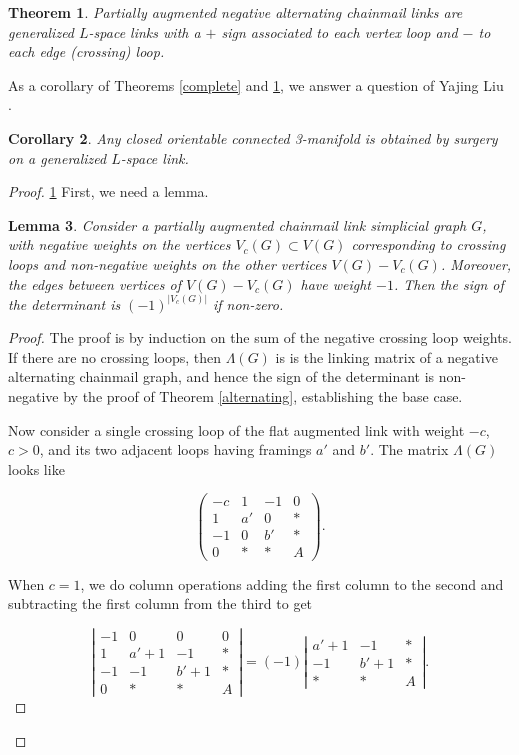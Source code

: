 \documentclass{amsart}
\newtheorem{theorem}{Theorem}[section]
\newtheorem{lemma}[theorem]{Lemma}
\newtheorem{cor}[theorem]{Corollary}
\theoremstyle{definition}
\theoremstyle{remark}
\begin{document}
\begin{theorem} \label{augmented} Partially augmented negative alternating chainmail links are generalized $L$-space links with a $+$ sign associated to each vertex loop and $-$ to each edge (crossing) loop.

\end{theorem}

As a corollary of Theorems \ref{complete} and \ref{augmented}, we answer a question of Yajing Liu \cite[Question 1.9]{MR3692910}. 
\begin{cor} Any closed orientable connected 3-manifold is obtained by surgery on a generalized $L$-space link.
\end{cor}

\begin{proof} \ref{augmented}
First, we need a lemma.

\begin{lemma}
Consider a partially augmented chainmail link simplicial graph $G$, with negative weights on the vertices $V_c(G) \subset V(G)$ corresponding to crossing loops and non-negative weights on the other vertices $V(G)-V_c(G)$. Moreover, the edges between vertices of $V(G)-V_c(G)$ have weight $-1$. Then the sign of the determinant is $(-1)^{|V_c(G)|}$ if non-zero. 

\end{lemma}
\begin{proof}
The proof is by induction on the sum of the negative crossing loop weights. If there are no crossing loops, then $\Lambda(G)$ is is the linking matrix of a negative alternating chainmail graph, and hence the sign of the determinant is non-negative by the proof of Theorem \ref{alternating}, establishing the base case. 

Now consider a single crossing loop of the flat augmented link with weight $- c$, $c > 0$, and its two adjacent loops having framings $a'$ and  $b'$. The matrix $\Lambda(G)$ looks like 

$$\left(\begin{array}{cccc}-c & 1 & -1 & 0 \\1 & a' & 0 & \ast \\-1 & 0 & b' & \ast \\0 & \ast & \ast & A\end{array}\right).$$

When $c=1$, we do column operations adding the first column to the second and subtracting the first column from the third to get 

 $$\left|\begin{array}{cccc}-1 & 0 & 0 & 0 \\1 & a'+1 & -1 & \ast \\-1 & -1 & b'+1 & \ast \\0 & \ast & \ast & A\end{array}\right| = (-1)\left|\begin{array}{ccc}a'+1 & -1 & \ast \\ -1 & b'+1 & \ast \\ \ast & \ast & A\end{array}\right|  .$$


\end{proof}
\end{proof}
\end{document}
